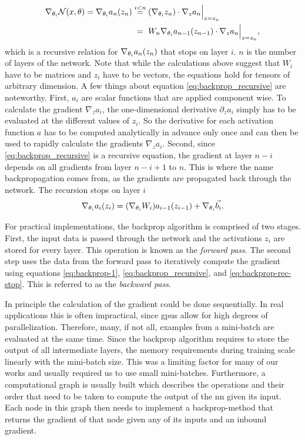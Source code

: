 \begin{align}\label{eq:backprop_recursive}
\nabla_{\theta_i} \mathcal{N}{\left( x, \theta \right)} = \nabla_{\theta_i}a_n{\left( z_n \right)} & \overset{i < n}{=}{\left( \nabla_{\theta_i}z_n \right)}\cdot\nabla_z a_n\Bigr|_{z=z_n}\nonumber\\
& \overset{\hphantom{i < n}}{=} W_n\nabla_{\theta_i}a_{n-1}{\left( z_{n-1} \right)}\cdot\nabla_z a_n\Bigr|_{z=z_n},
\end{align}
which is a recursive relation for $\nabla_{\theta_i}a_n{\left( z_n \right)}$ that stops on layer $i$. $n$ is the number of layers of the network. Note that while the calculations above suggest that $W_i$ have to be matrices and $z_i$ have to be vectors, the equations hold for tensors of arbitrary dimension. A few things about equation \eqref{eq:backprop_recursive} are noteworthy. First, $a_i$ are scalar functions that are applied component wise. To calculate the gradient $\nabla_z a_i$, the one-dimensional derivative $\partial_z a_i$ simply has to be evaluated at the different values of $z_i$. So the derivative for each activation function $a$ has to be computed analytically in advance only once and can then be used to rapidly calculate the gradients $\nabla_z a_i$. Second, since \eqref{eq:backprop_recursive} is a recursive equation, the gradient at layer $n-i$ depends on all gradients from layer $n-i+1$ to $n$. This is where the name backpropagation comes from, as the gradients are propagated back through the network. The recursion stops on layer $i$
\begin{equation}\label{eq:backprop-rec-stop}
\nabla_{\theta_i} a_i{\left( z_i \right)} = {\left( \nabla_{\theta_i} W_i \right)} a_{i-1}{\left( z_{i-1} \right)}+\nabla_{\theta_i}\vec{b_i}.
\end{equation}

For practical implementations, the backprop algorithm is comprised of two stages. First, the input data is passed through the network and the activations $z_i$ are stored for every layer. This operation is known as the \emph{forward pass}. The second step uses the data from the forward pass to iteratively compute the gradient using equations \eqref{eq:backprop-1}, \eqref{eq:backprop_recursive}, and \eqref{eq:backprop-rec-stop}. This is referred to as the \emph{backward pass}.

In principle the calculation of the gradient could be done sequentially. In real applications this is often impractical, since \acrshort{gpu}s allow for high degrees of parallelization. Therefore, many, if not all, examples from a mini-batch are evaluated at the same time. Since the backprop algorithm requires to store the output of all intermediate layers, the memory requirements during training scale linearly with the mini-batch size. This was a limiting factor for many of our works and usually required us to use small mini-batches. Furthermore, a computational graph is usually built which describes the operations and their order that need to be taken to compute the output of the \acrshort{nn} given its input. Each node in this graph then needs to implement a backprop-method that returns the gradient of that node given any of its inputs and an inbound gradient.


